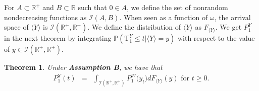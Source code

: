 \documentclass[aop]{imsart}
\theoremstyle{plain}
\newtheorem{theorem}{Theorem}[section]
\theoremstyle{remark}
\newcommand{\reels}{\mathbb{R}}
\newcommand{\proba}{\mathbb{P}}
\newcommand{\Tau}{\mathrm{T}}
\begin{document}
\noindent For $A \subset \reels^+$ and $B \subset \reels$ such that $0 \in A$, we define the set of nonrandom nondecreasing functions as $\mathcal{I}(A,B)$. When seen as a function of $\omega$, the arrival space of $\langle Y\rangle$ is $\mathcal{I}(\reels^+,\reels^+)$. We define the distribution of $\langle Y\rangle$ as $F_{\langle Y\rangle}$. We get $P_1^Y$ in the next theorem by integrating $\proba (\Tau^{Y}_1 \leq t |\langle Y\rangle=y)$ with respect to the value of $y \in \mathcal{I}(\reels^+,\reels^+)$.
\begin{theorem}
\label{theorem_rc1}
Under \textbf{Assumption B}, we have that
\begin{eqnarray}
\label{eq_theorem_rc1}
P_1^Y (t) & = & \int_{\mathcal{I}(\reels^+,\reels^+)} P_1^W \big(y_t\big) dF_{\langle Y\rangle}(y)\text{ for } t \geq 0.
\end{eqnarray}
\end{theorem}
\end{document}
